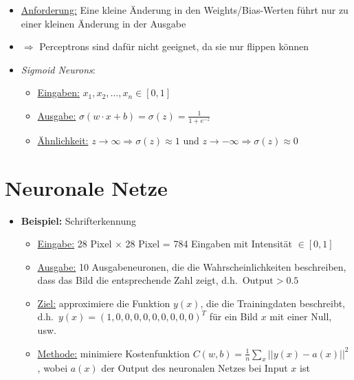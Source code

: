 \documentclass{scrartcl}
\begin{document}
\begin{itemize}
  \item \underline{Anforderung:} Eine kleine Änderung in den Weights/Bias-Werten führt nur zu einer kleinen Änderung in der Ausgabe
  \item $\Rightarrow$ Perceptrons sind dafür nicht geeignet, da sie nur flippen können
  \item \emph{Sigmoid Neurons}:
  \begin{itemize}
    \item \underline{Eingaben:} $x_1, x_2, \ldots, x_n \in [0, 1]$
    \item \underline{Ausgabe:} $\sigma(w \cdot x + b) = \sigma(z) = \frac{1}{1+e^{-z}}$
    \item \underline{Ähnlichkeit:} $z \rightarrow \infty \Rightarrow \sigma(z) \approx 1$ und $z \rightarrow - \infty \Rightarrow \sigma(z) \approx 0$
  \end{itemize}
\end{itemize}

\begin{center}
\end{center}

\section{Neuronale Netze}

\begin{itemize}
  \item \textbf{Beispiel:} Schrifterkennung
  \begin{itemize}
    \item \underline{Eingabe:} 28 Pixel $\times$ 28 Pixel = 784 Eingaben mit Intensität $\in [0,1]$
    \item \underline{Ausgabe:} 10 Ausgabeneuronen, die die Wahrscheinlichkeiten beschreiben, dass das Bild die entsprechende Zahl zeigt, d.h.\ $\text{Output} > 0.5$
    \item \underline{Ziel:} approximiere die Funktion $y(x)$, die die Trainingdaten beschreibt, d.h.\ $y(x) = {(1, 0, 0, 0, 0, 0, 0, 0, 0, 0)}^T$ für ein Bild $x$ mit einer Null, usw.
    \item \underline{Methode:} minimiere Kostenfunktion $C(w,b) = \frac{1}{n} \sum_x || y(x) - a(x) ||^2$, wobei $a(x)$ der Output des neuronalen Netzes bei Input $x$ ist
  \end{itemize}
\end{itemize}
\end{document}

